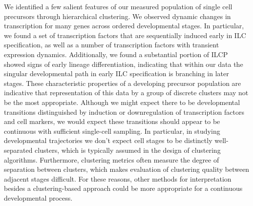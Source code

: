\begin{subappendices}
We identified a few salient features of our measured population of single cell precursors through hierarchical clustering. We observed dynamic changes in transcription for many genes across ordered developmental stages. In particular, we found a set of transcription factors that are sequentially induced early in ILC specification, as well as a number of transcription factors with transient expression dynamics. Additionally, we found a substantial portion of ILCP showed signs of early lineage differentiation, indicating that within our data the singular developmental path in early ILC specification is branching in later stages. These characteristic properties of a developing precursor population are indicative that representation of this data by a group of discrete clusters may not be the most appropriate. Although we might expect there to be developmental transitions distinguished by induction or downregulation of transcription factors and cell markers, we would expect these transitions should appear to be continuous with sufficient single-cell sampling. In particular, in studying developmental trajectories we don’t expect cell stages to be distinctly well-separated clusters, which is typically assumed in the design of clustering algorithms. Furthermore, clustering metrics often measure the degree of separation between clusters, which makes evaluation of clustering quality between adjacent stages difficult. For these reasons, other methods for interpretation besides a clustering-based approach could be more appropriate for a continuous developmental process. 


\end{subappendices}
